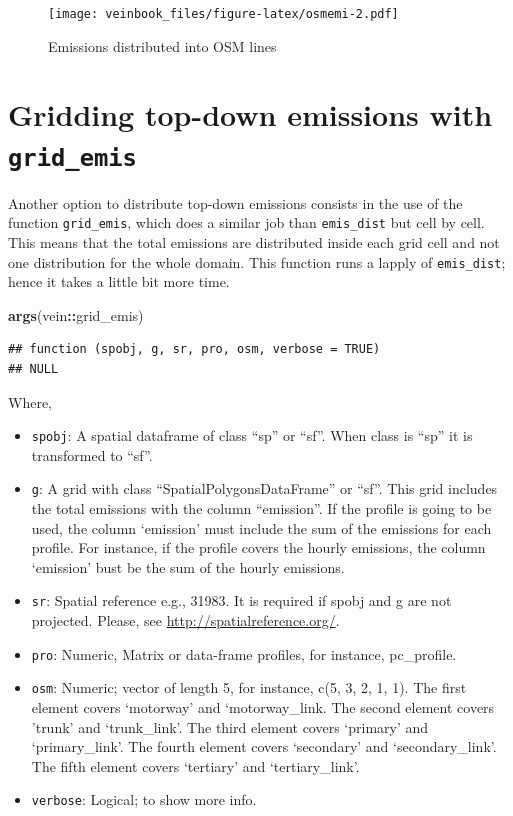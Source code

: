 \documentclass[12pt,graybox,envcountchap,sectrefs]{krantz}
\makeatletter
\newenvironment{Shaded}{\begin{snugshade}}{\end{snugshade}}
\newcommand{\KeywordTok}[1]{\textcolor[rgb]{0.13,0.29,0.53}{\textbf{#1}}}
\newcommand{\OperatorTok}[1]{\textcolor[rgb]{0.81,0.36,0.00}{\textbf{#1}}}
\newcommand{\NormalTok}[1]{#1}
\providecommand{\tightlist}{%
  \setlength{\itemsep}{0pt}\setlength{\parskip}{0pt}}
\newenvironment{kframe}{%
\medskip{}
\setlength{\fboxsep}{.8em}
 \def\at@end@of@kframe{}%
 \ifinner\ifhmode%
  \def\at@end@of@kframe{\end{minipage}}%
  \begin{minipage}{\columnwidth}%
 \fi\fi%
 \def\FrameCommand##1{\hskip\@totalleftmargin \hskip-\fboxsep
 \colorbox{shadecolor}{##1}\hskip-\fboxsep
     \hskip-\linewidth \hskip-\@totalleftmargin \hskip\columnwidth}%
 \MakeFramed {\advance\hsize-\width
   \@totalleftmargin\z@ \linewidth\hsize
   \@setminipage}}%
 {\par\unskip\endMakeFramed%
 \at@end@of@kframe}
\renewenvironment{Shaded}{\begin{kframe}}{\end{kframe}}
\theoremstyle{definition}
\theoremstyle{definition}
\theoremstyle{definition}
\theoremstyle{remark}
\makeatother
\begin{document}
\begin{figure}
\centering
\texttt{[image: veinbook\_files/figure-latex/osmemi-2.pdf]}
\caption{\label{fig:osmemi}Emissions distributed into OSM lines}
\end{figure}

\section{\texorpdfstring{Gridding top-down emissions with
\texttt{grid\_emis}}{Gridding top-down emissions with grid\_emis}}\label{gridding-top-down-emissions-with-grid_emis}

Another option to distribute top-down emissions consists in the use of
the function \texttt{grid\_emis}, which does a similar job than
\texttt{emis\_dist} but cell by cell. This means that the total
emissions are distributed inside each grid cell and not one distribution
for the whole domain. This function runs a lapply of
\texttt{emis\_dist}; hence it takes a little bit more time.

\begin{Shaded}
\begin{Highlighting}[]
\KeywordTok{args}\NormalTok{(vein}\OperatorTok{::}\NormalTok{grid_emis)}
\end{Highlighting}
\end{Shaded}

\begin{verbatim}
## function (spobj, g, sr, pro, osm, verbose = TRUE) 
## NULL
\end{verbatim}

Where,

\begin{itemize}
\tightlist
\item
  \texttt{spobj}: A spatial dataframe of class ``sp'' or ``sf''. When
  class is ``sp'' it is transformed to ``sf''.
\item
  \texttt{g}: A grid with class ``SpatialPolygonsDataFrame'' or ``sf''.
  This grid includes the total emissions with the column ``emission''.
  If the profile is going to be used, the column `emission' must include
  the sum of the emissions for each profile. For instance, if the
  profile covers the hourly emissions, the column `emission' bust be the
  sum of the hourly emissions.
\item
  \texttt{sr}: Spatial reference e.g., 31983. It is required if spobj
  and g are not projected. Please, see
  \url{http://spatialreference.org/}.
\item
  \texttt{pro}: Numeric, Matrix or data-frame profiles, for instance,
  pc\_profile.
\item
  \texttt{osm}: Numeric; vector of length 5, for instance, c(5, 3, 2, 1,
  1). The first element covers `motorway' and `motorway\_link. The
  second element covers 'trunk' and `trunk\_link'. The third element
  covers `primary' and `primary\_link'. The fourth element covers
  `secondary' and `secondary\_link'. The fifth element covers `tertiary'
  and `tertiary\_link'.
\item
  \texttt{verbose}: Logical; to show more info.
\end{itemize}
\end{document}
